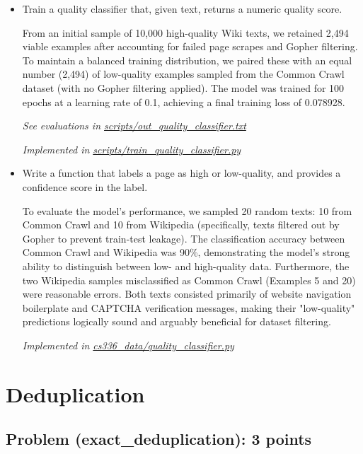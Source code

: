 \documentclass[letterpaper]{article}
\begin{document}
\begin{itemize}
	\item[(a)] Train a quality classifier that, given text, returns a numeric quality score.

	From an initial sample of 10,000 high-quality Wiki texts, we retained 2,494 viable examples after accounting for failed page scrapes and Gopher filtering. To maintain a balanced training distribution, we paired these with an equal number (2,494) of low-quality examples sampled from the Common Crawl dataset (with no Gopher filtering applied). The model was trained for 100 epochs at a learning rate of 0.1, achieving a final training loss of 0.078928.

	\textit{See evaluations in \href{https://github.com/echung32/ece405-assignment2-data/blob/main/scripts/out_quality_classifier.txt}{scripts/out\_quality\_classifier.txt}}

	\textit{Implemented in  \href{https://github.com/echung32/ece405-assignment2-data/blob/main/scripts/train\_quality_classifier.py}{scripts/train\_quality\_classifier.py}}

	\item[(b)] Write a function that labels a page as high or low-quality, and provides a confidence score in the label.

	To evaluate the model's performance, we sampled 20 random texts: 10 from Common Crawl and 10 from Wikipedia (specifically, texts filtered out by Gopher to prevent train-test leakage). The classification accuracy between Common Crawl and Wikipedia was 90\%, demonstrating the model's strong ability to distinguish between low- and high-quality data. Furthermore, the two Wikipedia samples misclassified as Common Crawl (Examples 5 and 20) were reasonable errors. Both texts consisted primarily of website navigation boilerplate and CAPTCHA verification messages, making their "low-quality" predictions logically sound and arguably beneficial for dataset filtering.

	\textit{Implemented in  \href{https://github.com/echung32/ece405-assignment2-data/blob/main/cs336_data/quality_classifier.py}{cs336\_data/quality\_classifier.py}}

\end{itemize}

\section{Deduplication}

\subsection{Problem (exact\_deduplication): 3 points}
\end{document}
